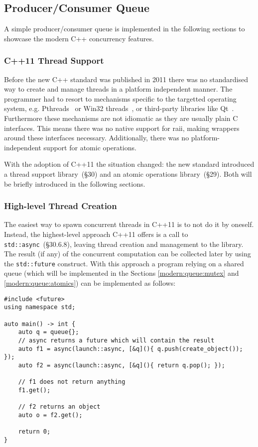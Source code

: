 \subsection{Producer/Consumer Queue}\label{modern:queue}

A simple producer/consumer queue is implemented in the following sections to showcase the modern C++ concurrency features.

\subsubsection{C++11 Thread Support}\label{modern:queue:support}

Before the new C++ standard was published in 2011 there was no standardised way to create and manage threads in a platform independent manner. The programmer had to resort to mechanisms specific to the targetted operating system, e.g. Pthreads~\cite{pthreads} or Win32 threads~\cite{win32threads}, or third-party libraries like Qt~\cite{qt}. Furthermore these mechanisms are not idiomatic as they are usually plain C interfaces. This means there was no native support for \gls{raii}, making wrappers around these interfaces necessary. Additionally, there was no platform-independent support for atomic operations.

With the adoption of C++11 the situation changed: the new standard introduced a thread support library~\cite{cpp11std}(§30) and an atomic operations library~\cite{cpp11std}(§29). Both will be briefly introduced in the following sections.

\subsubsection{High-level Thread Creation}\label{modern:queue:futures}

The easiest way to spawn concurrent threads in C++11 is to not do it by oneself. Instead, the highest-level approach C++11 offers is a call to \texttt{std::async}~\cite{cpp11std}(§30.6.8), leaving thread creation and management to the library. The result (if any) of the concurrent computation can be collected later by using the \texttt{std::future} construct. With this approach a program relying on a shared queue (which will be implemented in the Sections \ref{modern:queue:mutex} and \ref{modern:queue:atomics}) can be implemented as follows:

\begin{verbatim}
#include <future>
using namespace std;

auto main() -> int {
    auto q = queue{};
    // async returns a future which will contain the result
    auto f1 = async(launch::async, [&q](){ q.push(create_object()); });
    auto f2 = async(launch::async, [&q](){ return q.pop(); });
 
    // f1 does not return anything
    f1.get();

    // f2 returns an object
    auto o = f2.get();

    return 0;
}
\end{verbatim}

